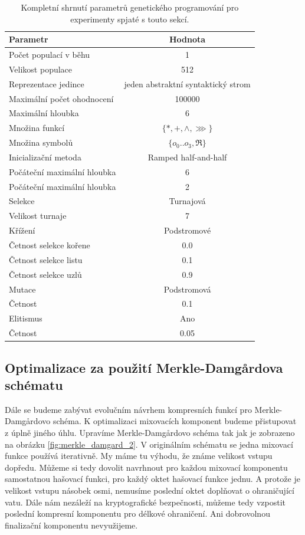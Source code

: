 \begin{table}[!ht]
	\centering
	\caption{Kompletní shrnutí parametrů genetického programování pro experimenty spjaté s touto sekcí.}
	\begin{tabular}{lc} \\ \hline
		Parametr & Hodnota \\ \hline
		Počet populací v běhu & 1 \\
		Velikost populace & 512 \\
		Reprezentace jedince & jeden abstraktní syntaktický strom \\ \hline
		Maximální počet ohodnocení & 100000 \\
		Maximální hloubka & 6 \\
		Množina funkcí & $\{*, +, \wedge, \ggg\}$ \\
		Množina symbolů & $\{o_{0} .. o_{3}, \Re \}$ \\
		\hline 
		Inicializační metoda & Ramped half-and-half \\
		Počáteční maximální hloubka & 6 \\
		Počáteční maximální hloubka & 2 \\
		\hline
		Selekce & Turnajová \\
		Velikost turnaje & 7 \\
		\hline
		Křížení & Podstromové \\
		Četnost selekce kořene & 0.0 \\
		Četnost selekce listu & 0.1 \\ 
		Četnost selekce uzlů & 0.9 \\
		\hline 
		Mutace & Podstromová \\
		Četnost & 0.1 \\
		\hline
		Elitismus & Ano \\
		Četnost & 0.05 \\
		\hline
	\end{tabular}
	\label{tab:IPHash_params}
\end{table}

\subsection{Optimalizace za použití Merkle-Damg\r{a}rdova schématu}

Dále se budeme zabývat evolučním návrhem kompresních funkcí pro Merkle-Damg\r{a}rdovo schéma.
K optimalizaci mixovacích komponent budeme přistupovat z úplně jiného úhlu. Upravíme  Merkle-Damg\r{a}rdovo
schéma tak jak je zobrazeno na obrázku \ref{fig:merkle_damgard_2}. V originálním schématu se
jedna mixovací funkce používá iterativně. My máme tu výhodu, že známe velikost vstupu dopředu. Můžeme
si tedy dovolit navrhnout pro každou mixovací komponentu samostatnou hašovací funkci, pro každý oktet
hašovací funkce jednu. A protože je velikost vstupu násobek osmi, nemusíme poslední oktet doplňovat o ohraničující vatu. Dále
nám nezáleží na kryptografické bezpečnosti, můžeme tedy vzpostit poslední kompresní komponentu
pro délkové ohraničení. Ani dobrovolnou finalizační komponentu nevyužijeme. 


